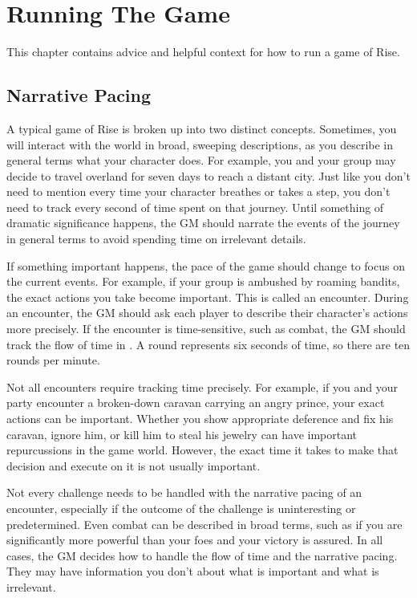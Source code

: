 \chapter{Running The Game}

This chapter contains advice and helpful context for how to run a game of Rise.

\section{Narrative Pacing}
    A typical game of Rise is broken up into two distinct concepts.
    Sometimes, you will interact with the world in broad, sweeping descriptions, as you describe in general terms what your character does.
    For example, you and your group may decide to travel overland for seven days to reach a distant city.
    Just like you don't need to mention every time your character breathes or takes a step, you don't need to track every second of time spent on that journey.
    Until something of dramatic significance happens, the GM should narrate the events of the journey in general terms to avoid spending time on irrelevant details.

    If something important happens, the pace of the game should change to focus on the current events.
    For example, if your group is ambushed by roaming bandits, the exact actions you take become important.
    This is called an encounter.
    During an encounter, the GM should ask each player to describe their character's actions more precisely.
    If the encounter is time-sensitive, such as combat, the GM should track the flow of time in .
    A round represents six seconds of time, so there are ten rounds per minute.

    Not all encounters require tracking time precisely.
    For example, if you and your party encounter a broken-down caravan carrying an angry prince, your exact actions can be important.
    Whether you show appropriate deference and fix his caravan, ignore him, or kill him to steal his jewelry can have important repurcussions in the game world.
    However, the exact time it takes to make that decision and execute on it is not usually important.

    Not every challenge needs to be handled with the narrative pacing of an encounter, especially if the outcome of the challenge is uninteresting or predetermined.
    Even combat can be described in broad terms, such as if you are significantly more powerful than your foes and your victory is assured.
    In all cases, the GM decides how to handle the flow of time and the narrative pacing.
    They may have information you don't about what is important and what is irrelevant.

